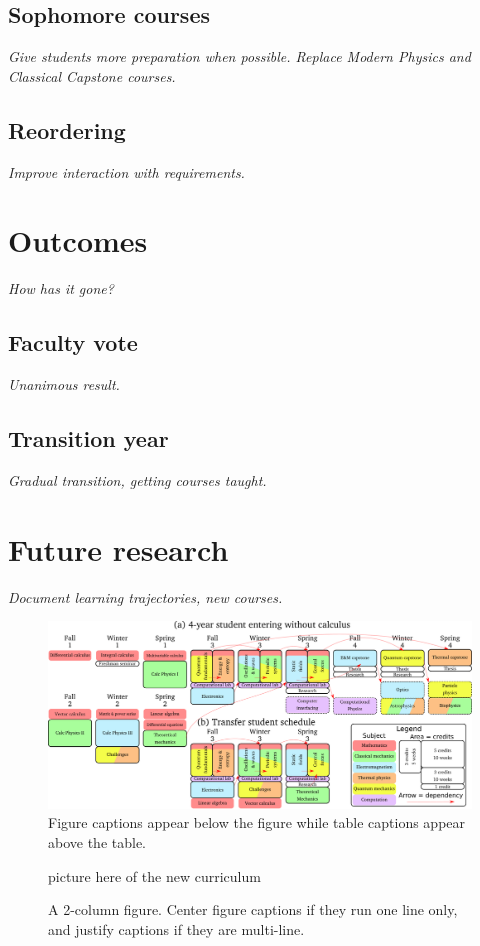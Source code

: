 \documentclass[english,aps,pra,reprint,noshowpacs,superscriptaddress]{revtex4-1}
\begin{document}
\subsection{Sophomore courses}
\emph{Give students more preparation when possible.  Replace Modern
  Physics and Classical Capstone courses.}
\subsection{Reordering}
\emph{Improve interaction with requirements.}

\section{Outcomes}
\emph{How has it gone?}

\subsection{Faculty vote}
\emph{Unanimous result.}
\subsection{Transition year}
\emph{Gradual transition, getting courses taught.}

\section{Future research}
\emph{Document learning trajectories, new courses.}

\begin{figure}
\includegraphics[width=\textwidth]{schedule}
\caption{Figure captions appear below the figure while table captions appear above the table.\label{fig1}}
\end{figure}

\begin{figure}
  picture here of the new curriculum
\caption{A 2-column figure. Center figure captions if they run one
  line only, and justify captions if they are multi-line.\label{fig2}}
\end{figure}
\end{document}
